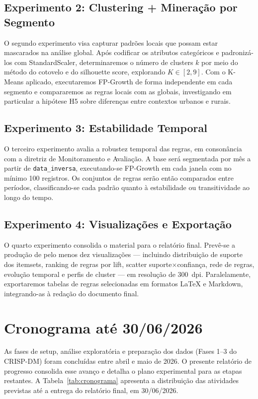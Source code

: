 \documentclass[12pt]{article}
\begin{document}
\subsection{Experimento 2: Clustering + Mineração por Segmento}

O segundo experimento visa capturar padrões locais que possam estar mascarados na análise global. Após codificar os atributos categóricos e padronizá-los com StandardScaler, determinaremos o número de clusters $k$ por meio do método do cotovelo e do silhouette score, explorando $K \in [2, 9]$. Com o K-Means aplicado, executaremos FP-Growth de forma independente em cada segmento e compararemos as regras locais com as globais, investigando em particular a hipótese H5 sobre diferenças entre contextos urbanos e rurais.

\subsection{Experimento 3: Estabilidade Temporal}

O terceiro experimento avalia a robustez temporal das regras, em consonância com a diretriz de Monitoramento e Avaliação. A base será segmentada por mês a partir de \texttt{data\_inversa}, executando-se FP-Growth em cada janela com no mínimo 100 registros. Os conjuntos de regras serão então comparados entre períodos, classificando-se cada padrão quanto à estabilidade ou transitividade ao longo do tempo.

\subsection{Experimento 4: Visualizações e Exportação}

O quarto experimento consolida o material para o relatório final. Prevê-se a produção de pelo menos dez visualizações --- incluindo distribuição de suporte dos itemsets, ranking de regras por lift, scatter suporte$\times$confiança, rede de regras, evolução temporal e perfis de cluster --- em resolução de 300~dpi. Paralelamente, exportaremos tabelas de regras selecionadas em formatos LaTeX e Markdown, integrando-as à redação do documento final.

\section{Cronograma até 30/06/2026}

As fases de setup, análise exploratória e preparação dos dados (Fases 1--3 do CRISP-DM) foram concluídas entre abril e maio de 2026. O presente relatório de progresso consolida esse avanço e detalha o plano experimental para as etapas restantes. A Tabela~\ref{tab:cronograma} apresenta a distribuição das atividades previstas até a entrega do relatório final, em 30/06/2026.
\end{document}

